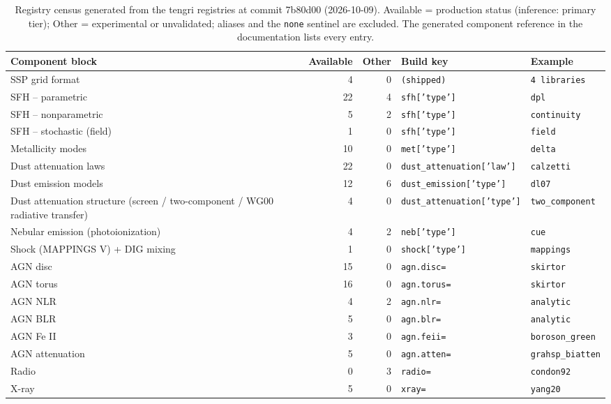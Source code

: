 \begin{table}
\caption{Registry census generated from the tengri registries at commit 7b80d00 (2026-10-09). Available = production status (inference: primary tier); Other = experimental or unvalidated; aliases and the \texttt{none} sentinel are excluded. The generated component reference in the documentation lists every entry.}
\label{tab:registry_census}
\begin{tabular}{lrrll}
\toprule
Component block & Available & Other & Build key & Example \\
\midrule
SSP grid format & 4 & 0 & \texttt{(shipped)} & \texttt{4 libraries} \\
SFH -- parametric & 22 & 4 & \texttt{sfh['type']} & \texttt{dpl} \\
SFH -- nonparametric & 5 & 2 & \texttt{sfh['type']} & \texttt{continuity} \\
SFH -- stochastic (field) & 1 & 0 & \texttt{sfh['type']} & \texttt{field} \\
Metallicity modes & 10 & 0 & \texttt{met['type']} & \texttt{delta} \\
Dust attenuation laws & 22 & 0 & \texttt{dust\_attenuation['law']} & \texttt{calzetti} \\
Dust emission models & 12 & 6 & \texttt{dust\_emission['type']} & \texttt{dl07} \\
Dust attenuation structure (screen / two-component / WG00 radiative transfer) & 4 & 0 & \texttt{dust\_attenuation['type']} & \texttt{two\_component} \\
Nebular emission (photoionization) & 4 & 2 & \texttt{neb['type']} & \texttt{cue} \\
Shock (MAPPINGS V) + DIG mixing & 1 & 0 & \texttt{shock['type']} & \texttt{mappings} \\
AGN disc & 15 & 0 & \texttt{agn.disc=} & \texttt{skirtor} \\
AGN torus & 16 & 0 & \texttt{agn.torus=} & \texttt{skirtor} \\
AGN NLR & 4 & 2 & \texttt{agn.nlr=} & \texttt{analytic} \\
AGN BLR & 5 & 0 & \texttt{agn.blr=} & \texttt{analytic} \\
AGN Fe II & 3 & 0 & \texttt{agn.feii=} & \texttt{boroson\_green} \\
AGN attenuation & 5 & 0 & \texttt{agn.atten=} & \texttt{grahsp\_biatten} \\
Radio & 0 & 3 & \texttt{radio=} & \texttt{condon92} \\
X-ray & 5 & 0 & \texttt{xray=} & \texttt{yang20} \\

\end{tabular}
\end{table}
